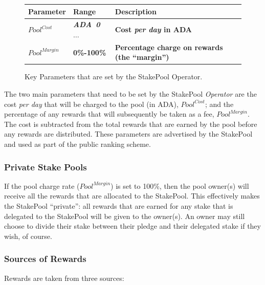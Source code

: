 \documentclass[11pt,a4paper,dvipsnames,twosided,final]{article}
\newcommand{\ada}{ADA{}}
\newcommand{\ADA}[1]{\textbf{\emph{\ada~{#1}}}}
\begin{document}
\begin{figure}[h!]
\begin{center}
\begin{tabular}{||l|l|p{9cm}||}
  \hline \hline
\textbf{Parameter} & \textbf{Range} & \textbf{Description} \\\hline
       \textbf{\color{red} $\textit{Pool}^{\textit{Cost}}$} &  \textbf{\color{red}  \ADA{0} $\ldots$} & \textbf{\color{red} Cost
         \emph{per day} in \ada{}} \\\hline
\textbf{\color{red} ${\textit{Pool}}^{\textit{Margin}}$} &  \textbf{\color{red} 0\%-100\%} & \textbf{\color{red} Percentage charge on rewards (the ``margin'')} \\\hline
  \hline
\end{tabular}
\end{center}
\caption{Key Parameters that are set by the StakePool Operator.}
\end{figure}

\noindent
The two main parameters that need to be set by the StakePool \emph{Operator} are the cost \emph{per day} that will be charged to
the pool (in \ada), $\textit{Pool}^{\textit{Cost}}$; and the percentage of any rewards that will subsequently be taken as a fee, ${\textit{Pool}}^{\textit{Margin}}$.
The cost is subtracted from the total rewards that are earned by the pool before any rewards are distributed.
These parameters are advertised by the StakePool and used as part of the public ranking scheme.

\subsubsection*{Private Stake Pools}

If the pool charge rate (${\textit{Pool}}^{\textit{Margin}}$) is set to 100\%, then the pool owner(s) will receive
all the rewards that are allocated to the StakePool.  This effectively makes the StakePool ``private'':
all rewards that are earned for any stake that is delegated to the StakePool will be given to the owner(s).
An owner may still choose to divide their stake between their pledge and their delegated stake if they wish, of course.

\subsubsection*{Sources of Rewards}

Rewards are taken from three sources:
\end{document}
